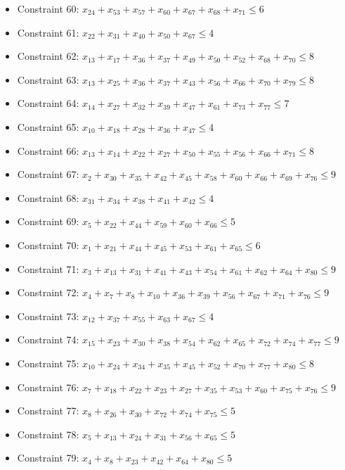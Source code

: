 \documentclass[11pt]{article}
\begin{document}
\begin{itemize}
\item Constraint 60: $x_{24} + x_{53} + x_{57} + x_{60} + x_{67} + x_{68} + x_{71} \le 6$
\item Constraint 61: $x_{22} + x_{31} + x_{40} + x_{50} + x_{67} \le 4$
\item Constraint 62: $x_{13} + x_{17} + x_{36} + x_{37} + x_{49} + x_{50} + x_{52} + x_{68} + x_{70} \le 8$
\item Constraint 63: $x_{13} + x_{25} + x_{36} + x_{37} + x_{43} + x_{56} + x_{66} + x_{70} + x_{79} \le 8$
\item Constraint 64: $x_{14} + x_{27} + x_{32} + x_{39} + x_{47} + x_{61} + x_{73} + x_{77} \le 7$
\item Constraint 65: $x_{10} + x_{18} + x_{28} + x_{36} + x_{47} \le 4$
\item Constraint 66: $x_{13} + x_{14} + x_{22} + x_{27} + x_{50} + x_{55} + x_{56} + x_{66} + x_{71} \le 8$
\item Constraint 67: $x_{2} + x_{30} + x_{35} + x_{42} + x_{45} + x_{58} + x_{60} + x_{66} + x_{69} + x_{76} \le 9$
\item Constraint 68: $x_{31} + x_{34} + x_{38} + x_{41} + x_{42} \le 4$
\item Constraint 69: $x_{5} + x_{22} + x_{44} + x_{59} + x_{60} + x_{66} \le 5$
\item Constraint 70: $x_{1} + x_{21} + x_{44} + x_{45} + x_{53} + x_{61} + x_{65} \le 6$
\item Constraint 71: $x_{3} + x_{13} + x_{31} + x_{41} + x_{43} + x_{54} + x_{61} + x_{62} + x_{64} + x_{80} \le 9$
\item Constraint 72: $x_{4} + x_{7} + x_{8} + x_{10} + x_{36} + x_{39} + x_{56} + x_{67} + x_{71} + x_{76} \le 9$
\item Constraint 73: $x_{12} + x_{37} + x_{55} + x_{63} + x_{67} \le 4$
\item Constraint 74: $x_{15} + x_{23} + x_{30} + x_{38} + x_{54} + x_{62} + x_{65} + x_{72} + x_{74} + x_{77} \le 9$
\item Constraint 75: $x_{10} + x_{24} + x_{34} + x_{35} + x_{45} + x_{52} + x_{70} + x_{77} + x_{80} \le 8$
\item Constraint 76: $x_{7} + x_{18} + x_{22} + x_{23} + x_{27} + x_{35} + x_{53} + x_{60} + x_{75} + x_{76} \le 9$
\item Constraint 77: $x_{8} + x_{26} + x_{30} + x_{72} + x_{74} + x_{75} \le 5$
\item Constraint 78: $x_{5} + x_{13} + x_{24} + x_{31} + x_{56} + x_{65} \le 5$
\item Constraint 79: $x_{4} + x_{8} + x_{23} + x_{42} + x_{64} + x_{80} \le 5$

\end{itemize}
\end{document}

